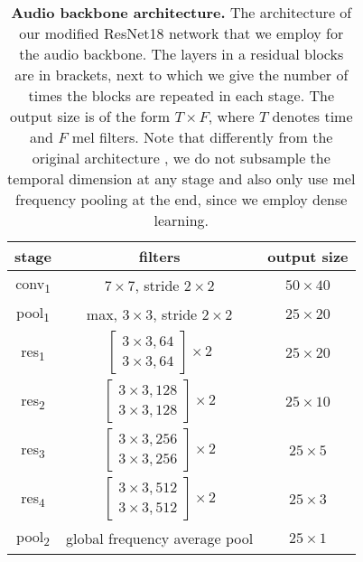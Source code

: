 \documentclass[10pt,twocolumn,letterpaper]{article}
\begin{document}
\begin{table}[tb]
\begin{center}
\begin{tabular}{c | c | c}
stage & filters & output size  \\ \toprule
conv\textsubscript{1} & $7\times 7$, stride $2\times 2$ & $50\times 40$ \\ \midrule
pool\textsubscript{1} & max, $3\times 3$, stride $2\times 2$ & $25\times 20$ \\ \midrule
res\textsubscript{1} & $\begin{bmatrix} 3\times 3, 64 \\ 3\times 3, 64 \end{bmatrix} \times 2$ & $25\times 20$ \\ \midrule
res\textsubscript{2} & $\begin{bmatrix} 3\times 3, 128 \\ 3\times 3, 128 \end{bmatrix} \times 2$ & $25\times 10$ \\ \midrule
res\textsubscript{3} & $\begin{bmatrix} 3\times 3, 256 \\ 3\times 3, 256 \end{bmatrix} \times 2$ & $25\times 5$ \\ \midrule
res\textsubscript{4} & $\begin{bmatrix} 3\times 3, 512 \\ 3\times 3, 512 \end{bmatrix} \times 2$ & $25\times 3$ \\ \midrule
pool\textsubscript{2} & global frequency average pool & $25\times 1$ \\ \midrule
\end{tabular}
\end{center}
\caption{\textbf{Audio backbone architecture.} The architecture of our modified ResNet18 \cite{he2016deep} network that we employ for the audio backbone. The layers in a residual blocks are in brackets, next to which we give the number of times the blocks are repeated in each stage. The output size is of the form $T\times F$, where $T$ denotes time and $F$ mel filters. Note that differently from the original architecture \cite{he2016deep}, we do not subsample the temporal dimension at any stage and also only use mel frequency pooling at the end, since we employ dense learning.}
\label{table:rn_arch}
\end{table}
\end{document}

